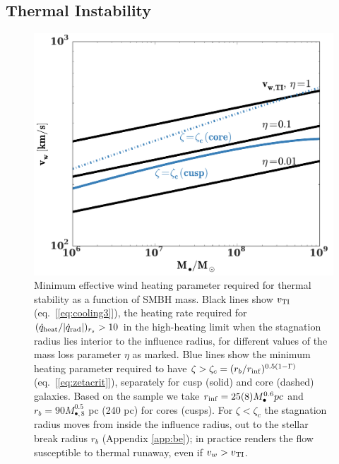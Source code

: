 \documentclass[usenatbib,fleqn]{mn2e}
\newcommand{\rb}{r_b}
\newcommand{\Mbh}[1][]{M_{\bullet#1}}
\newcommand{\Mbheight}{M_{\bullet,8}}
\newcommand{\rinf}{r_{\rm inf}}
\begin{document}
\subsection{Thermal Instability}
\label{sec:instability}


\begin{figure}
  \includegraphics[width=\columnwidth]{ti.pdf}
  \caption{Minimum effective wind heating parameter required for
    thermal stability as a function of SMBH mass.  Black lines show
    $v_{\rm TI}$ (eq.~[\ref{eq:cooling3}]), the heating rate required
    for $(\dot{q}_{\rm heat}/|\dot{q}_{\rm rad}|)_{r_{s}} > 10$ in the
    high-heating limit when the stagnation radius lies interior to the
    influence radius, for different values of the mass loss parameter
    $\eta$ as marked.  Blue lines show the minimum heating parameter
    required to have $\zeta > \zeta_c = (r_{b}/r_{\rm
      inf})^{0.5(1-\Gamma)}$ (eq.~[\ref{eq:zetacrit}]), separately for
    cusp (solid) and core (dashed) galaxies. Based on the
    \citet{LauerFaber+:2007a} sample we take $\rinf=25 (8) \Mbh^{0.6}
    pc$ and $\rb=90 \Mbheight^{0.5}$ pc (240 pc) for cores
    (cusps). For $\zeta < \zeta_c$ the stagnation radius moves from
    inside the influence radius, out to the stellar break radius $r_b$
    (Appendix \ref{app:be}); in practice renders the flow susceptible
    to thermal runaway, even if $v_{w} > v_{\rm TI}$.  
}
\label{fig:TI}
\end{figure}
\end{document}
